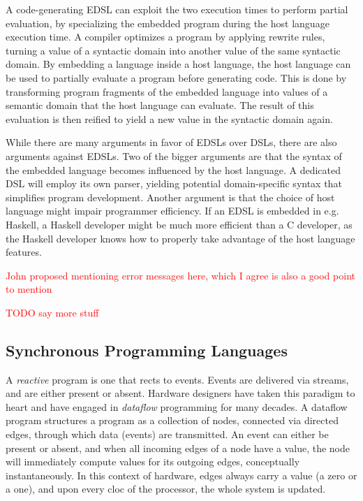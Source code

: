 A code-generating EDSL can exploit the two execution times to perform partial evaluation\cite{DBLP:conf/haskell/ValliappanRL21},
by specializing the embedded program during the host language execution time. A compiler optimizes a program by applying
rewrite rules, turning a value of a syntactic domain into another value of the same syntactic domain.
By embedding a language inside a host language, the host language can be used to partially evaluate a program before
generating code. This is done by transforming program fragments of the embedded language into values of a semantic domain
that the host language can evaluate. The result of this evaluation is then reified to yield a new value in the syntactic
domain again.

While there are many arguments in favor of EDSLs over DSLs, there are also arguments against EDSLs. Two of the bigger arguments
are that the syntax of the embedded language becomes influenced by the host language. A dedicated DSL will employ its own parser,
yielding potential domain-specific syntax that simplifies program development. Another argument is that the choice of host language
might impair programmer efficiency. If an EDSL is embedded in e.g. Haskell, a Haskell developer might be much more efficient
than a C developer, as the Haskell developer knows how to properly take advantage of the host language features.

\textcolor{red}{John proposed mentioning error messages here, which I agree is also a good point to mention}

\textcolor{red}{TODO say more stuff}

\subsection{Synchronous Programming Languages}

A \textit{reactive} program is one that rects to events. Events are delivered via streams, and are either present or absent.
Hardware designers have taken this paradigm to heart and have engaged in \textit{dataflow} programming for many decades.
A dataflow program structures a program as a collection of nodes, connected via directed edges, through which data (events) are
transmitted. An event can either be present or absent, and when all incoming edges of a node have a value, the node will
immediately compute values for its outgoing edges, conceptually instantaneously. In this context of hardware, edges always
carry a value (a zero or a one), and upon every cloc of the processor, the whole system is updated.

